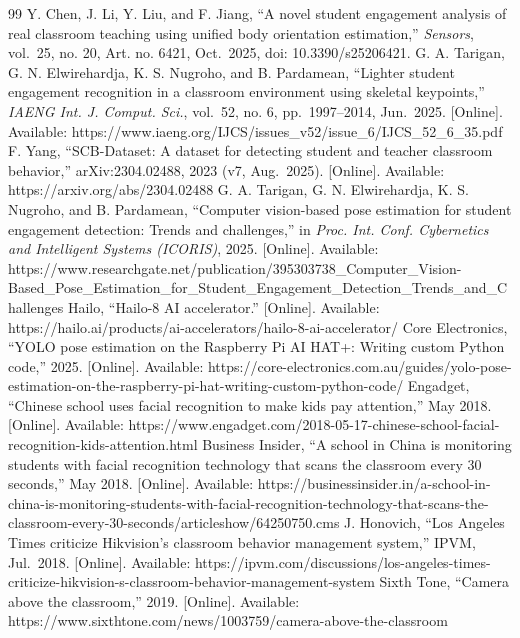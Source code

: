 \begin{thebibliography}{99}
 Y. Chen, J. Li, Y. Liu, and F. Jiang, ``A novel student engagement analysis of real classroom teaching using unified body orientation estimation,'' \emph{Sensors}, vol.~25, no. 20, Art. no. 6421, Oct.~2025, doi: 10.3390/s25206421.
 G. A. Tarigan, G. N. Elwirehardja, K. S. Nugroho, and B. Pardamean, ``Lighter student engagement recognition in a classroom environment using skeletal keypoints,'' \emph{IAENG Int. J. Comput. Sci.}, vol.~52, no. 6, pp.~1997--2014, Jun.~2025. {[}Online{]}. Available: https://www.iaeng.org/IJCS/issues\_v52/issue\_6/IJCS\_52\_6\_35.pdf
 F. Yang, ``SCB-Dataset: A dataset for detecting student and teacher classroom behavior,'' arXiv:2304.02488, 2023 (v7, Aug.~2025). {[}Online{]}. Available: https://arxiv.org/abs/2304.02488
 G. A. Tarigan, G. N. Elwirehardja, K. S. Nugroho, and B. Pardamean, ``Computer vision-based pose estimation for student engagement detection: Trends and challenges,'' in \emph{Proc. Int. Conf. Cybernetics and Intelligent Systems (ICORIS)}, 2025. {[}Online{]}. Available: https://www.researchgate.net/publication/395303738\_Computer\_Vision-Based\_Pose\_Estimation\_for\_Student\_Engagement\_Detection\_Trends\_and\_Challenges
 Hailo, ``Hailo-8 AI accelerator.'' {[}Online{]}. Available: https://hailo.ai/products/ai-accelerators/hailo-8-ai-accelerator/
 Core Electronics, ``YOLO pose estimation on the Raspberry Pi AI HAT+: Writing custom Python code,'' 2025. {[}Online{]}. Available: https://core-electronics.com.au/guides/yolo-pose-estimation-on-the-raspberry-pi-hat-writing-custom-python-code/
 Engadget, ``Chinese school uses facial recognition to make kids pay attention,'' May 2018. {[}Online{]}. Available: https://www.engadget.com/2018-05-17-chinese-school-facial-recognition-kids-attention.html
 Business Insider, ``A school in China is monitoring students with facial recognition technology that scans the classroom every 30 seconds,'' May 2018. {[}Online{]}. Available: https://businessinsider.in/a-school-in-china-is-monitoring-students-with-facial-recognition-technology-that-scans-the-classroom-every-30-seconds/articleshow/64250750.cms
 J. Honovich, ``Los Angeles Times criticize Hikvision's classroom behavior management system,'' IPVM, Jul.~2018. {[}Online{]}. Available: https://ipvm.com/discussions/los-angeles-times-criticize-hikvision-s-classroom-behavior-management-system
 Sixth Tone, ``Camera above the classroom,'' 2019. {[}Online{]}. Available: https://www.sixthtone.com/news/1003759/camera-above-the-classroom

\end{thebibliography}
